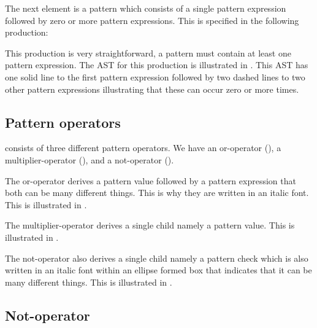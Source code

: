 The next element is a pattern which consists of a single pattern expression followed by zero or more pattern expressions. This is specified in the following production:%

\begin{ebnf}%
%
\end{ebnf}%

This production is very straightforward, a pattern must contain at least one pattern expression. The AST for this production is illustrated in . This AST has one solid line to the first pattern expression followed by two dashed lines to two other pattern expressions illustrating that these can occur zero or more times.%

%

\subsection{Pattern operators}%

\productname{} consists of three different pattern operators. We have an or-operator (), a multiplier-operator (), and a not-operator ().%

The or-operator derives a pattern value followed by a pattern expression that both can be many different things. This is why they are written in an italic font. This is illustrated in .%

%

The multiplier-operator derives a single child namely a pattern value. This is illustrated in .%

%

The not-operator also derives a single child namely a pattern check which is also written in an italic font within an ellipse formed box that indicates that it can be many different things. This is illustrated in .%

%

\subsection{Not-operator}%

